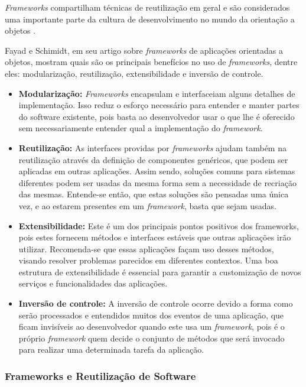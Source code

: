 \textit{Frameworks} compartilham técnicas de reutilização em geral e são considerados uma importante parte da cultura de desenvolvimento no mundo da orientação a objetos \cite{Johnson:1997}.

Fayad e Schimidt, em seu artigo \cite{Fayad:Schimidt:1997} sobre \textit{frameworks} de aplicações orientadas a objetos, mostram quais são os principais benefícios no uso de \textit{frameworks}, dentre eles: modularização, reutilização, extensibilidade e inversão de controle.

\begin{itemize}
	\item \textbf{Modularização:} \textit{Frameworks} encapsulam e interfaceiam alguns detalhes de implementação. Isso reduz o esforço necessário para entender e manter partes do software existente, pois basta ao desenvolvedor usar o que lhe é oferecido sem necessariamente entender qual a implementação do \textit{framework}.

	\item \textbf{Reutilização:} As interfaces providas por \textit{frameworks} ajudam também na reutilização através da definição de componentes genéricos, que podem ser aplicadas em outras aplicações. Assim sendo, soluções comuns para sistemas diferentes podem ser usadas da mesma forma sem a necessidade de recriação das mesmas. Entende-se então, que estas soluções são pensadas uma única vez, e ao estarem presentes em um \textit{framework}, basta que sejam usadas.

	\item \textbf{Extensibilidade:} Este é um dos principais pontos positivos dos frameworks, pois estes fornecem métodos e interfaces estáveis que outras aplicações irão utilizar. Recomenda-se que essas aplicações façam uso desses métodos, visando resolver problemas parecidos em diferentes contextos. Uma boa estrutura de extensibilidade é essencial para garantir a customização de novos serviços e funcionalidades das aplicações.

	\item \textbf{Inversão de controle:} A inversão de controle ocorre devido a forma como serão processados e entendidos muitos dos eventos de uma aplicação, que ficam invisíveis ao desenvolvedor quando este usa um \textit{framework}, pois é o próprio \textit{framework} quem decide o conjunto de métodos que será invocado para realizar uma determinada tarefa da aplicação.
\end{itemize}

\subsubsection{Frameworks e Reutilização de Software}

